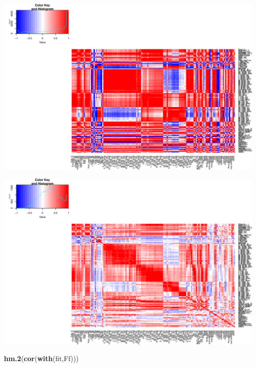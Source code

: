 \documentclass[]{article}
\newenvironment{Shaded}{\begin{snugshade}}{\end{snugshade}}
\newcommand{\KeywordTok}[1]{\textcolor[rgb]{0.13,0.29,0.53}{\textbf{{#1}}}}
\newcommand{\NormalTok}[1]{{#1}}
\begin{document}
\includegraphics{Figs/Heatmap decomposition-1.pdf}

\begin{Shaded}
\end{Shaded}

\includegraphics{Figs/Heatmap decomposition-2.pdf}

\begin{Shaded}
\begin{Highlighting}[]
\KeywordTok{hm.2}\NormalTok{(}\KeywordTok{cor}\NormalTok{(}\KeywordTok{with}\NormalTok{(fit,Ff)))}
\end{Highlighting}
\end{Shaded}
\end{document}
